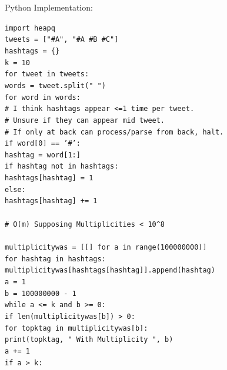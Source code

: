 Python Implementation:

\texttt{import heapq} \\
\texttt{tweets = ["\#A", "\#A \#B \#C"]} \\
\texttt{hashtags = \{\}} \\
\texttt{k = 10} \\
\texttt{for tweet in tweets:} \\
\phantom{xxxx}\texttt{words = tweet.split(" ")} \\
\phantom{xxxx}\texttt{for word in words:} \\
\phantom{xxxxxxxx}\texttt{\# I think hashtags appear <=1 time per tweet.} \\
\phantom{xxxxxxxx}\texttt{\# Unsure if they can appear mid tweet.} \\
\phantom{xxxxxxxx}\texttt{\# If only at back can process/parse from back, halt.} \\
\phantom{xxxxxxxx}\texttt{if word[0] == '\#':} \\
\phantom{xxxxxxxxxxxx}\texttt{hashtag = word[1:]} \\
\phantom{xxxxxxxxxxxx}\texttt{if hashtag not in hashtags:} \\
\phantom{xxxxxxxxxxxxxxxx}\texttt{hashtags[hashtag] = 1} \\
\phantom{xxxxxxxxxxxx}\texttt{else:} \\
\phantom{xxxxxxxxxxxxxxxx}\texttt{hashtags[hashtag] += 1} \\
~\\
\texttt{\# O(m) Supposing Multiplicities < 10\^{}8} \\
~\\
\texttt{multiplicitywas = [[] for a in range(100000000)]} \\
\texttt{for hashtag in hashtags:} \\
\phantom{xxxx}\texttt{multiplicitywas[hashtags[hashtag]].append(hashtag)} \\
\texttt{a = 1} \\
\texttt{b = 100000000 - 1} \\
\texttt{while a <= k and b >= 0:} \\
\phantom{xxxx}\texttt{if len(multiplicitywas[b]) > 0:} \\
\phantom{xxxxxxxx}\texttt{for topktag in multiplicitywas[b]:} \\
\phantom{xxxxxxxxxxxx}\texttt{print(topktag, " With Multiplicity ", b)} \\
\phantom{xxxxxxxxxxxx}\texttt{a += 1} \\
\phantom{xxxxxxxxxxxx}\texttt{if a > k:} \\
